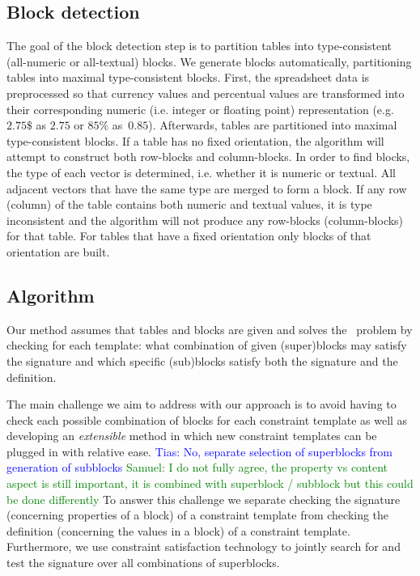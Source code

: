 \documentclass{IEEEtran}
\newcommand{\samuel}[1]{\textcolor{green}{{\sc Samuel:} #1}\xspace}
\newcommand{\tias}[1]{\textcolor{blue}{{\sc Tias:} #1}\xspace}
\theoremstyle{definition}
\begin{document}
\subsection{Block detection} \label{sec:make_groups}
The goal of the block detection step is to partition tables into type-consistent (all-numeric or all-textual) blocks.
We generate blocks automatically, partitioning tables into maximal type-consistent blocks.
First, the spreadsheet data is preprocessed so that currency values and percentual values are transformed into their corresponding numeric (i.e. integer or floating point) representation (e.g. $2.75 \$$ as $2.75$ or $85\%$ as~$0.85$).
Afterwards, tables are partitioned into maximal type-consistent blocks.
If a table has no fixed orientation, the algorithm will attempt to construct both row-blocks and column-blocks.
In order to find blocks, the type of each vector is determined, i.e. whether it is numeric or textual.
All adjacent vectors that have the same type are merged to form a block. 
If any row (column) of the table contains both numeric and textual values, it is type inconsistent and the algorithm will not produce any row-blocks (column-blocks) for that table.
For tables that have a fixed orientation only blocks of that orientation are built.

\newcommand{\temps}{\ensuremath{S}}

\subsection{Algorithm}
\label{sec:algo}
Our method assumes that tables and blocks are given and solves the \tcl~problem by checking for each template: what combination of given (super)blocks may satisfy the signature and which specific (sub)blocks satisfy both the signature and the definition.

The main challenge we aim to address with our approach is to avoid having to check each possible combination of blocks for each constraint template as well as developing an \textit{extensible} method in which new constraint templates can be plugged in with relative ease. %
\tias{No, separate selection of superblocks from generation of subblocks}
\samuel{I do not fully agree, the property vs content aspect is still important, it is combined with superblock / subblock but this could be done differently}
To answer this challenge we separate checking the signature (concerning properties of a block) of a constraint template from checking the definition (concerning the values in a block) of a constraint template.
Furthermore, we use constraint satisfaction technology to jointly search for and test the signature over all combinations of superblocks.
\end{document}
